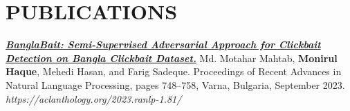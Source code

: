 \documentclass[letterpaper,10.5pt]{article}
\newcommand{\resumeSubHeadingListStart}{\begin{itemize}[leftmargin=0.0in, label={}]}
\newcommand{\resumeSubHeadingListEnd}{\end{itemize}}
\begin{document}

\section{PUBLICATIONS}

\href{https://aclanthology.org/2023.ranlp-1.81/}{\textbf{\emph{\color{NavyBlue} BanglaBait: Semi-Supervised Adversarial Approach for Clickbait Detection on Bangla Clickbait Dataset.}}} Md. Motahar Mahtab, \textbf{Monirul Haque}, Mehedi Hasan, and Farig Sadeque. Proceedings of Recent Advances in Natural Language Processing, pages 748–758, Varna, Bulgaria, September 2023. \emph{https://aclanthology.org/2023.ranlp-1.81/}

\vspace{-4pt}

\end{document}
